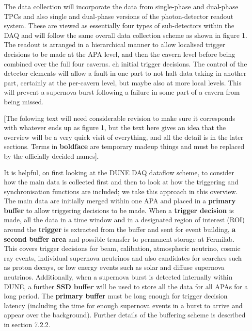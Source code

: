 The data collection will incorporate the data from single-phase and
dual-phase TPCs and also single and dual-phase versions of the
photon-detector readout system.  These are viewed as essentially four
types of sub-detectors within the DAQ and will follow the same overall
data collection scheme as shown in figure 1.  The readout is arranged
in a hierarchical manner to allow localised trigger decisions to be
made at the APA level, and then the cavern level before being combined
over the full four caverns.  ch initial trigger decisions.  The
control of the detector elements will allow a fault in one part to not
halt data taking in another part, certainly at the per-cavern level,
but maybe also at more local levels.  This will prevent a supernova
burst following a failure in some part of a cavern from being missed.

[The folowing text will need considerable revision to make sure it
  corresponds with whatever ends up as figure 1, but the text here
  gives an idea that the overview will be a very quick visit of
  everything, and all the detail is in the later sections.  Terms in
  {\bf boldface} are temporary madeup things and must be replaced by the
  officially decided names].

It is helpful, on first looking at the DUNE DAQ dataflow scheme, to
consider how the main data is collected first and then to look at how
the triggering and synchronisation functions are included; we take
this approach in this overview.  The main data are initially merged
within one APA and placed in a {\bf primary buffer} to allow
triggering decisions to be made.  When a {\bf trigger decision} is
made, all the data in a time window and in a designated region of
interest (ROI) around the {\bf trigger} is extracted from the buffer
and sent for event building, {\bf a second buffer area} and possible
transfer to permanent storage at Fermilab.  This covers trigger
decisions for beam, calibation, atmospheric neutrino, cosmic ray
events, individual supernova neutrinos and also candidates for
searches such as proton decays, or low energy events such as solar and
diffuse supernova neutrinos.  Additionally, when a supernova burst is
detected internally within DUNE, a further {\bf SSD buffer} will be
used to store all the data for all APAs for a long period.  The {\bf
  primary buffer} must be long enough for trigger decision latency
(including the time for enough supernova events in a burst to arrive
and appear over the background). Further details of the buffering
scheme is described in section 7.2.2.

